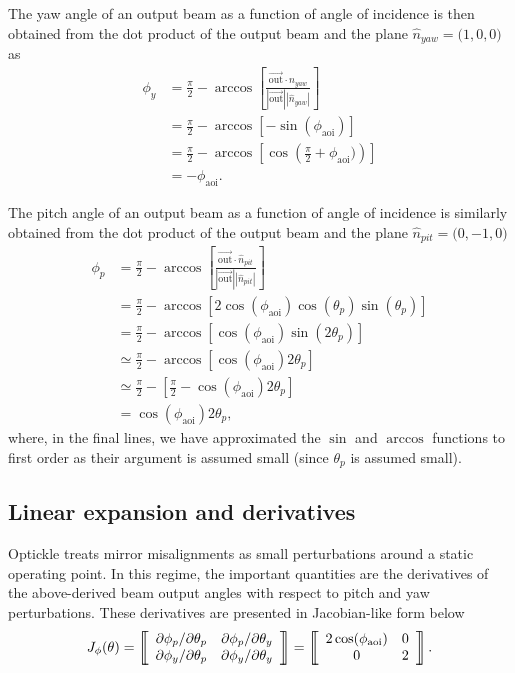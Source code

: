 \documentclass[12pt]{article}
\newcommand{\threeVec}[3]{\big( {#1}, {#2}, {#3} \big)}
\newcommand{\myVec}[1]{\vec{#1}}
\begin{document}
The yaw angle of an output beam as a function of angle of incidence is
then obtained from the dot product of the output beam and the plane
$\hat{n}_{yaw}=\threeVec{1}{0}{0}$ as
\begin{align}
  \phi_y &= \frac{\pi}{2} - \arccos\left[\frac{\myVec{\mathrm{out}}\cdot\hat{n}_{yaw}}{|\myVec{\mathrm{out}}||\hat{n}_{yaw}|}\right]\\
  &=\frac{\pi}{2} - \arccos\left[ -\sin(\phi_\mathrm{aoi}) \right]\\
  &=\frac{\pi}{2} - \arccos\left[ \cos\left(\frac{\pi}{2}+\phi_\mathrm{aoi})\right) \right]\\
&=-\phi_\mathrm{aoi}.
\end{align}

The pitch angle of an output beam as a function of angle of incidence
is similarly obtained from the dot product of the output beam and the plane
$\hat{n}_{pit}=\threeVec{0}{-1}{0}$
\begin{align}
  \phi_p &= \frac{\pi}{2} - \arccos\left[\frac{\myVec{\mathrm{out}}\cdot\hat{n}_{pit}}{|\myVec{\mathrm{out}}||\hat{n}_{pit}|}\right]\\
  &=\frac{\pi}{2} - \arccos\left[2\cos(\phi_\mathrm{aoi})\cos(\theta_p)\sin(\theta_p)\right]\\
&=\frac{\pi}{2} - \arccos\left[\cos(\phi_\mathrm{aoi})\sin(2\theta_p)\right]\\
&\simeq \frac{\pi}{2} - \arccos\left[\cos(\phi_\mathrm{aoi})2\theta_p\right]\\
&\simeq \frac{\pi}{2} - \left[\frac{\pi}{2}-\cos(\phi_\mathrm{aoi})2\theta_p\right]\\
&=\cos(\phi_\mathrm{aoi})2\theta_p,
\end{align}
where, in the final lines, we have approximated the $\sin$ and $\arccos$
functions to first order as their argument is assumed small (since
$\theta_p$ is assumed small).

\subsection{Linear expansion and derivatives}
Optickle treats mirror misalignments as small perturbations around a
static operating point. In this regime, the important quantities are
the derivatives of the above-derived beam output angles with respect
to pitch and yaw perturbations. These derivatives are presented in
Jacobian-like form below
\begin{equation}
  J_\phi(\theta)=
\matrixBegin{cc}
 \partial \phi_p/\partial \theta_p & \partial \phi_p/\partial \theta_y \\
\partial \phi_y/\partial \theta_p & \partial \phi_y/\partial \theta_y
\matrixEnd
=\matrixBegin{cc}
 2\cos(\phi_\mathrm{aoi}) & 0 \\
0 & 2 
\matrixEnd.
\end{equation}
\end{document}

